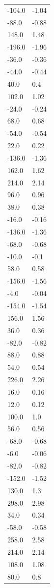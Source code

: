 \begin{longtable}{ll}
-104.0 & -1.04 \\
-88.0 & -0.88 \\
148.0 & 1.48 \\
-196.0 & -1.96 \\
-36.0 & -0.36 \\
-44.0 & -0.44 \\
40.0 & 0.4 \\
102.0 & 1.02 \\
-24.0 & -0.24 \\
68.0 & 0.68 \\
-54.0 & -0.54 \\
22.0 & 0.22 \\
-136.0 & -1.36 \\
162.0 & 1.62 \\
214.0 & 2.14 \\
96.0 & 0.96 \\
38.0 & 0.38 \\
-16.0 & -0.16 \\
-136.0 & -1.36 \\
-68.0 & -0.68 \\
-10.0 & -0.1 \\
58.0 & 0.58 \\
-156.0 & -1.56 \\
-4.0 & -0.04 \\
-154.0 & -1.54 \\
156.0 & 1.56 \\
36.0 & 0.36 \\
-82.0 & -0.82 \\
88.0 & 0.88 \\
54.0 & 0.54 \\
226.0 & 2.26 \\
16.0 & 0.16 \\
12.0 & 0.12 \\
100.0 & 1.0 \\
56.0 & 0.56 \\
-68.0 & -0.68 \\
-6.0 & -0.06 \\
-82.0 & -0.82 \\
-152.0 & -1.52 \\
130.0 & 1.3 \\
298.0 & 2.98 \\
34.0 & 0.34 \\
-58.0 & -0.58 \\
258.0 & 2.58 \\
214.0 & 2.14 \\
108.0 & 1.08 \\
80.0 & 0.8 \\

\end{longtable}
